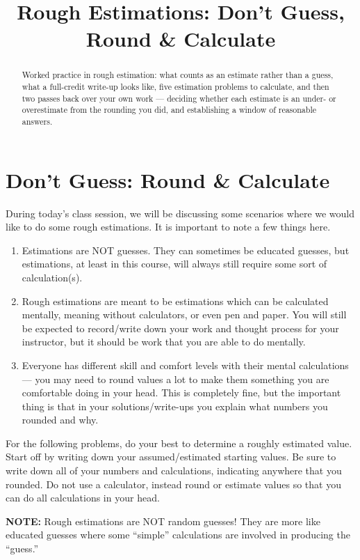 \documentclass[12pt]{ximera}
\title{Rough Estimations: Don't Guess, Round \& Calculate}
\begin{document}
\begin{abstract}
Worked practice in rough estimation: what counts as an estimate rather than a guess,
what a full-credit write-up looks like, five estimation problems to calculate, and then
two passes back over your own work --- deciding whether each estimate is an under- or
overestimate from the rounding you did, and establishing a window of reasonable answers.
\end{abstract}
\maketitle

\section*{Don't Guess: Round \& Calculate}

During today's class session, we will be discussing some scenarios where we would like
to do some rough estimations. It is important to note a few things here.

\begin{enumerate}
\item[(1)] Estimations are NOT guesses. They can sometimes be educated guesses, but
estimations, at least in this course, will always still require some sort of
calculation(s).
\item[(2)] Rough estimations are meant to be estimations which can be calculated
mentally, meaning without calculators, or even pen and paper. You will still be
expected to record/write down your work and thought process for your instructor, but it
should be work that you are able to do mentally.
\item[(3)] Everyone has different skill and comfort levels with their mental
calculations --- you may need to round values a lot to make them something you are
comfortable doing in your head. This is completely fine, but the important thing is
that in your solutions/write-ups you explain what numbers you rounded and why.
\end{enumerate}

For the following problems, do your best to determine a roughly estimated value. Start
off by writing down your assumed/estimated starting values. Be sure to write down all
of your numbers and calculations, indicating anywhere that you rounded. Do not use a
calculator, instead round or estimate values so that you can do all calculations in your
head.

\textbf{NOTE:} Rough estimations are NOT random guesses! They are more like educated
guesses where some ``simple'' calculations are involved in producing the ``guess.''
\end{document}

